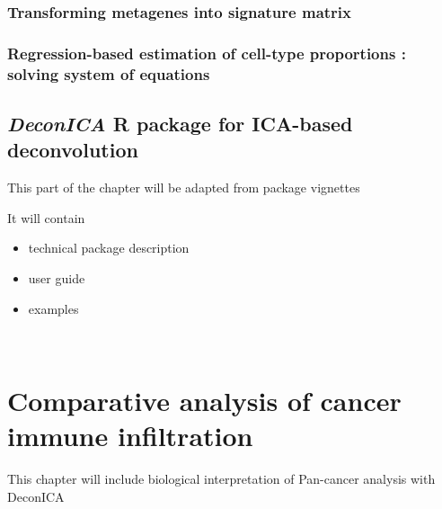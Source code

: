 \documentclass[12pt,]{book}
\theoremstyle{definition}
\theoremstyle{definition}
\theoremstyle{definition}
\theoremstyle{remark}
\begin{document}
\hypertarget{transforming-metagenes-into-signature-matrix}{%
\subsection{Transforming metagenes into signature
matrix}\label{transforming-metagenes-into-signature-matrix}}

\hypertarget{regression-based-estimation-of-cell-type-proportions-solving-system-of-equations}{%
\subsection{Regression-based estimation of cell-type proportions :
solving system of
equations}\label{regression-based-estimation-of-cell-type-proportions-solving-system-of-equations}}

\hypertarget{deconica-r-package-for-ica-based-deconvolution}{%
\section{\texorpdfstring{\emph{DeconICA} R package for ICA-based
deconvolution}{DeconICA R package for ICA-based deconvolution}}\label{deconica-r-package-for-ica-based-deconvolution}}

This part of the chapter will be adapted from package vignettes

It will contain

\begin{itemize}
\item
  technical package description
\item
  user guide
\item
  examples

  ​
\end{itemize}



\hypertarget{results}{%
\chapter{Comparative analysis of cancer immune
infiltration}\label{results}}

This chapter will include biological interpretation of Pan-cancer
analysis with DeconICA
\end{document}
